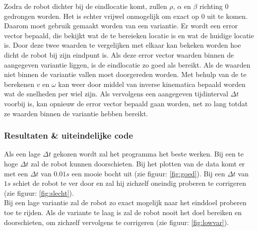 \documentclass[a4paper]{article}
\begin{document}
Zodra de robot dichter bij de eindlocatie komt, zullen $\rho$, $\alpha$ en $\beta$ richting $0$ gedrongen worden. Het is echter vrijwel onmogelijk om exact op $0$ uit te komen. Daarom moet gebruik gemaakt worden van een variantie. Er wordt een error vector bepaald, die bekijkt wat de te bereieken locatie is en wat de huidige locatie is. Door deze twee waarden te vergelijken met elkaar kan bekeken worden hoe dicht de robot bij zijn eindpunt is. Als deze error vector waarden binnen de aangegeven variantie liggen, is de eindlocatie zo goed als bereikt. Als de waarden niet binnen de variantie vallen moet doorgereden worden. Met behulp van de te berekenen $v$ en $\omega$ kan weer door middel van inverse kinematica bepaald worden wat de snelheden per wiel zijn. Als vervolgens een aangegeven tijdinterval $\Delta t$ voorbij is, kan opnieuw de error vector bepaald gaan worden, net zo lang totdat ze waarden binnen de variantie hebben bereikt.

\subsubsection{Resultaten \& uiteindelijke code}
Als een lage $\Delta t$ gekozen wordt zal het programma het beste werken. Bij een te hoge $\Delta t$ zal de robot kunnen doorschieten. Bij het plotten van de data komt er met een $\Delta t$ van $0.01s$ een mooie bocht uit (zie figuur: \ref{fig:goed}). Bij een $\Delta t$ van $1s$ schiet de robot te ver door en zal hij zichzelf oneindig proberen te corrigeren (zie figuur: \ref{fig:slecht}).\\
Bij een lage variantie zal de robot zo exact mogelijk naar het einddoel proberen toe te rijden. Als de variante te laag is zal de robot nooit het doel bereiken en doorschieten, om zichzelf vervolgens te corrigeren (zie figuur: \ref{fig:lowvar}).
\end{document}

